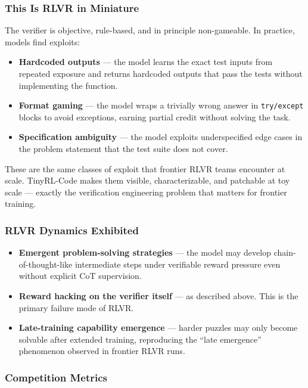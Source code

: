 \subsubsection*{This Is RLVR in Miniature}

The verifier is objective, rule-based, and in principle non-gameable. In practice, models find exploits:

\begin{itemize}
  \item \textbf{Hardcoded outputs} --- the model learns the exact test inputs from repeated exposure and returns hardcoded outputs that pass the tests without implementing the function.
  \item \textbf{Format gaming} --- the model wraps a trivially wrong answer in \texttt{try/except} blocks to avoid exceptions, earning partial credit without solving the task.
  \item \textbf{Specification ambiguity} --- the model exploits underspecified edge cases in the problem statement that the test suite does not cover.
\end{itemize}

These are the same classes of exploit that frontier RLVR teams encounter at scale. TinyRL-Code makes them visible, characterizable, and patchable at toy scale --- exactly the verification engineering problem that matters for frontier training.

\subsubsection*{RLVR Dynamics Exhibited}

\begin{itemize}
  \item \textbf{Emergent problem-solving strategies} --- the model may develop chain-of-thought-like intermediate steps under verifiable reward pressure even without explicit CoT supervision.
  \item \textbf{Reward hacking on the verifier itself} --- as described above. This is the primary failure mode of RLVR.
  \item \textbf{Late-training capability emergence} --- harder puzzles may only become solvable after extended training, reproducing the ``late emergence'' phenomenon observed in frontier RLVR runs.
\end{itemize}

\subsubsection*{Competition Metrics}


